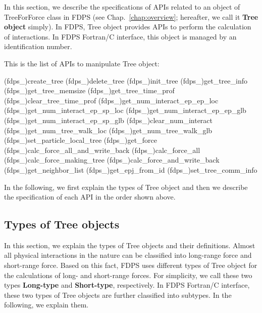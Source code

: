 \newcommand{\tlap}[1]{\vbox to 0pt{\vss\hbox{#1}}}
\newcommand{\blap}[1]{\vbox to 0pt{\hbox{#1}\vss}}

In this section, we describe the specifications of APIs related to an object of TreeForForce class in FDPS (see Chap.~\ref{chap:overview}; hereafter, we call it \textbf{Tree object} simply). In FDPS, Tree object provides APIs to perform the calculation of interactions. In FDPS Fortran/C interface, this object is managed by an identification number.

This is the list of APIs to manipulate Tree object:
\begin{screen}
\begin{spverbatim}
(fdps_)create_tree
(fdps_)delete_tree
(fdps_)init_tree
(fdps_)get_tree_info
(fdps_)get_tree_memsize
(fdps_)get_tree_time_prof
(fdps_)clear_tree_time_prof
(fdps_)get_num_interact_ep_ep_loc
(fdps_)get_num_interact_ep_sp_loc
(fdps_)get_num_interact_ep_ep_glb
(fdps_)get_num_interact_ep_sp_glb
(fdps_)clear_num_interact
(fdps_)get_num_tree_walk_loc
(fdps_)get_num_tree_walk_glb
(fdps_)set_particle_local_tree
(fdps_)get_force
(fdps_)calc_force_all_and_write_back
(fdps_)calc_force_all
(fdps_)calc_force_making_tree
(fdps_)calc_force_and_write_back
(fdps_)get_neighbor_list
(fdps_)get_epj_from_id
(fdps_)set_tree_comm_info
\end{spverbatim}  
\end{screen}

In the following, we first explain the types of Tree object and then we describe the specification of each API in the order shown above.
\clearpage

\subsection{Types of Tree objects}
In this section, we explain the types of Tree objects and their definitions. Almost all physical interactions in the nature can be classified into long-range force and short-range force. Based on this fact, FDPS uses different types of Tree object for the calculations of long- and short-range forces. For simplicity, we call these two types \textbf{Long-type} and \textbf{Short-type}, respectively. In FDPS Fortran/C interface, these two types of Tree objects are further classified into subtypes. In the following, we explain them.

